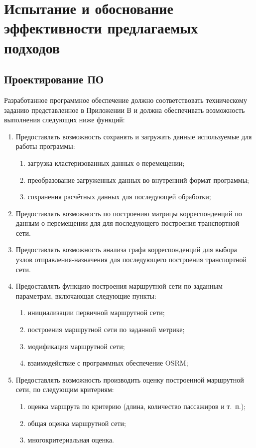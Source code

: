 \chapter{Испытание и обоснование эффективности предлагаемых подходов}
\section{Проектирование ПО}
Разработанное программное обеспечение должно соответствовать техническому заданию представленное в Приложении 
В и должна обеспечивать возможность выполнения следующих ниже функций:
\begin{enumerate}
    \item Предоставлять возможность сохранять и загружать данные используемые для работы программы:
    \begin{enumerate}
        \item загрузка кластеризованных данных о перемещении;
        \item преобразование загруженных данных во внутренний формат программы;
        \item сохранения расчётных данных для последующей обработки;
    \end{enumerate}
    \item Предоставлять возможность по построению матрицы корреспонденций по данным о перемещении для 
        для последующего построения транспортной сети.
    \item Предоставлять возможность анализа графа корреспонденций для выбора узлов отправления-назначения для 
        последующего построения транспортной сети.
    \item Предоставлять функцию построения маршрутной сети по заданным параметрам, включающая следующие 
        пункты:
    \begin{enumerate}
        \item инициализации первичной маршрутной сети;
        \item построения маршрутной сети по заданной метрике;
        \item модификация маршрутной сети;
        \item взаимодействие с программных обеспечение OSRM;
    \end{enumerate}
    \item Предоставлять возможность производить оценку построенной маршрутной сети, по следующим критериям:
    \begin{enumerate}
        \item оценка маршрута по критерию (длина, количество пассажиров и т.~п.);
        \item общая оценка маршрутной сети;
        \item многокритериальная оценка.
    \end{enumerate}
\end{enumerate}

